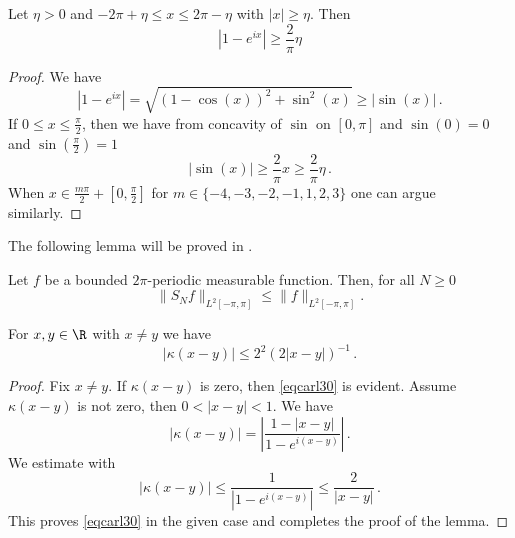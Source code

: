 \begin{lemma}
    \label{lower-secant-bound}
    \leanok
    Let $\eta>0$ and $-2\pi +\eta \le x\le 2\pi-\eta$ with $|x|\ge \eta$. Then
    \begin{equation}
        |1-e^{ix}|\ge \frac{2}{\pi} \eta
    \end{equation}
\end{lemma}
\begin{proof}
    \leanok
    We have
    $$
        |1 - e^{ix}| = \sqrt{(1 - \cos(x))^2 + \sin^2(x)} \ge |\sin(x)|\,.
    $$
    If $0 \le x \le \frac{\pi}{2}$, then we have from concavity of $\sin$ on $[0, \pi]$ and $\sin(0) = 0$ and $\sin(\frac{\pi}{2}) = 1$
    $$
        |\sin(x)| \ge \frac{2}{\pi} x \ge \frac{2}{\pi} \eta\,.
    $$
    When $x\in \frac{m\pi}{2} + [0, \frac{\pi}{2}]$ for $m \in \{-4, -3, -2, -1, 1, 2, 3\}$ one can argue similarly.
\end{proof}

The following lemma will be proved in .

\begin{lemma}
\label{spectral-projection-bound}
    Let $f$ be a bounded $2\pi$-periodic measurable function. Then, for all $N\ge 0$
   \begin{equation}\label{snbound}
   \|S_Nf\|_{L^2[-\pi, \pi]} \le \|f\|_{L^2[-\pi, \pi]}.
   \end{equation}
\end{lemma}

\begin{lemma}
\label{Hilbert-kernel-bound}
\leanok
{}
    For $x,y\in \R$ with $x\neq y$ we have
    \begin{equation}\label{eqcarl30}
        |\kappa(x-y)|\le 2^2(2|x-y|)^{-1}\, .
    \end{equation}
\end{lemma}
\begin{proof}
\leanok
    Fix $x\neq y$. If $\kappa(x-y)$ is zero, then \eqref{eqcarl30} is evident. Assume $\kappa(x-y)$ is not zero, then $0<|x-y|<1$.
    We have
\begin{equation}\label{eqcarl31}
|\kappa(x-y)|=\left|\frac {1-|x-y|}{1-e^{i(x-y)}}\right|\, .
\end{equation}
We estimate
with 
\begin{equation}\label{eqcarl311}
|\kappa(x-y)|\le \frac {1}{|1-e^{i(x-y)}|}\le \frac 2{|x-y|}\, .
\end{equation}
This proves \eqref{eqcarl30} in the given case and completes the proof of the lemma.
\end{proof}

